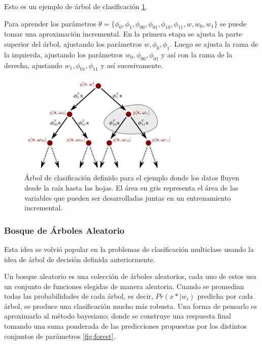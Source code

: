 \documentclass[letter,12pt]{report}
\begin{document}
Esto es un ejemplo de árbol de clasificación \ref{fig:tree}.

Para aprender los parámetros $\theta = \{\phi_0, \phi_1, \phi_{00}, \phi_{01}, \phi_{10},
\phi_{11}, w, w_0, w_1\}$ se puede tomar una aproximación incremental. En la primera etapa
se ajusta la parte superior del árbol, ajustando los parámetros $w, \phi_0, \phi_1$.
Luego se ajusta la rama de la izquierda, ajustando los parámetros $w_0, \phi_{00},
\phi_{01}$ y así con la rama de la derecha, ajustando $w_1, \phi_{01}, \phi_{11}$ y así
sucesivamente.

\begin{figure}[H]
    \centering
    \includegraphics[width=0.7\textwidth]{tree}
    \caption{Árbol de clasificación definido para el ejemplo donde los datos fluyen desde
        la raíz hasta las hojas. El área en gris representa el área de las variables que
    pueden ser desarrolladas juntas en un entrenamiento incremental.}
    \label{fig:tree}
\end{figure}

\subsubsection{Bosque de Árboles Aleatorio}
Esta idea se volvió popular en la problemas de clasificación multiclase usando la idea
de árbol de decisión definida anteriormente.

Un bosque aleatorio \cite{Forest} es una colección de árboles aleatorios, cada uno de
estos usa un conjunto de funciones elegidas de manera aleatoria. Cuando se promedian
todas las probabilidades de cada árbol, es decir, $Pr(x*|w_i)$ predicha por cada árbol, se
produce una clasificación mucho más robusta. Una forma de pensarlo es aproximarlo al
método bayesiano; donde se construye una respuesta final tomando una suma ponderada de las
predicciones propuestas por los distintos conjuntos de parámetros \ref{fig:forest}.
\end{document}
